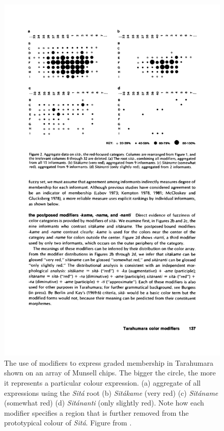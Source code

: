 \begin{figure}[htbp]
  \begin{center}
   \includegraphics[width=\textwidth]{./intro/figures/tarahumara.pdf}
   \caption[The use of modifiers in Tarahumara]{The use of modifiers
     to express graded membership in Tarahumara shown on an array of
     Munsell chips. The bigger the circle, the more it represents a
     particular colour expression. (a) aggregate of all expressions
     using the \textit{Sit\'a} root (b) \textit{Sit\'akame} (very red) (c)
     \textit{Sit\'aname} (somewhat red) (d) \textit{Sit\'ananti} (only slightly
     red). Note how each modifier specifies a region that is further
     removed from the prototypical colour of \textit{Sit\'a}. Figure from
     \cite{burgress83tarahumara}.}
    \label{f:tarahumara}
  \end{center}
\end{figure}

